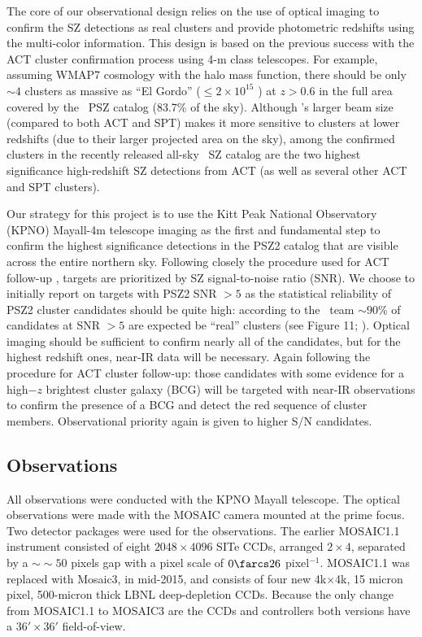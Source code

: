\documentclass[apj, revtex4-1]{emulateapj}
\begin{document}
The core of our observational design relies on the use of optical imaging to confirm the SZ detections as real clusters and provide photometric redshifts using the multi-color information. This design is based on the previous success with the ACT cluster confirmation process using 4-m class telescopes.
%
For example, assuming WMAP7 cosmology \citep{Komatsu2011} with the \cite{Tinker2008} halo mass function, there should be only $\sim4$ clusters as massive as “El Gordo” ($\leq 2 \times 10^{15}$ \Msol) at $z > 0.6$ in the full area covered by the \planck\ PSZ catalog (83.7\% of the sky). Although \planck’s larger beam size (compared to both ACT and SPT) makes it more sensitive to clusters at lower redshifts (due to their larger projected area on the sky), among the confirmed clusters in the recently released all-sky \planck\ SZ catalog are the two highest significance high-redshift SZ detections from ACT (as well as several other ACT and SPT clusters).

Our strategy for this project is to use the Kitt Peak National Observatory (KPNO) Mayall-4m telescope imaging as the first and fundamental step to confirm the highest significance detections in the PSZ2 catalog that are visible across the entire northern sky.
%
%
Following closely the procedure used for ACT follow-up , targets are prioritized by SZ signal-to-noise ratio (SNR). We choose to initially report on targets with PSZ2 SNR $>5$ as the statistical reliability of PSZ2 cluster candidates should be quite high: according to the \planck\ team $\sim90$\% of candidates at SNR $>5$ are expected be ``real'' clusters (see Figure 11; \citealt{PlanckCollaboration2016}).
%
Optical imaging should be sufficient to confirm nearly all of the candidates, but for the highest redshift ones, near-IR data will be necessary. Again following the procedure for ACT cluster follow-up: those candidates with some evidence for a high$-z$ brightest cluster galaxy (BCG) will be targeted with near-IR observations to confirm the presence of a BCG and detect the red sequence of cluster members. Observational priority again is given to higher S/N candidates.

\subsection{Observations}\label{sec: observations}
All observations were conducted with the KPNO Mayall telescope. The optical observations were made with the MOSAIC camera mounted at the prime focus. Two detector packages were used for the observations. The earlier MOSAIC1.1 instrument consisted of eight $2048\times4096$ SITe CCDs, arranged $2\times4$, separated by a $∼\sim50$ pixels gap with a pixel scale of $0\farcs26$ pixel$^{-1}$. MOSAIC1.1 was replaced with Mosaic3, in mid-2015, and consists of four new 4k$\times$4k, 15 micron pixel, 500-micron thick LBNL deep-depletion CCDs. Because the only change from MOSAIC1.1 to MOSAIC3 are the CCDs and controllers both versions have a $36' \times 36'$ field-of-view.
\end{document}
